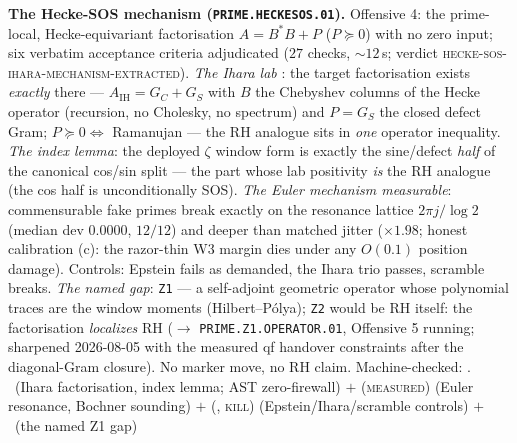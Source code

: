 \par\smallskip\noindent\textbf{The Hecke-SOS mechanism
(\texttt{PRIME.HECKESOS.01}).}
Offensive 4: the prime-local, Hecke-equivariant factorisation
$A=B^*B+P$ ($P\succeq0$) with no zero input; six verbatim acceptance
criteria adjudicated ($27$ checks, ${\sim}12$\,s; verdict
\textsc{hecke-sos-ihara-mechanism-extracted}).  \emph{The Ihara lab}
\mE: the target factorisation exists \emph{exactly} there ---
$A_{\mathrm{IH}}=G_C+G_S$ with $B$ the Chebyshev columns of the
Hecke operator (recursion, no Cholesky, no spectrum) and $P=G_S$ the
closed defect Gram; $P\succeq0\iff$ Ramanujan --- the RH analogue
sits in \emph{one} operator inequality.  \emph{The index lemma}: the
deployed $\zeta$ window form is exactly the sine/defect \emph{half}
of the canonical cos/sin split --- the part whose lab positivity
\emph{is} the RH analogue (the cos half is unconditionally SOS).
\emph{The Euler mechanism measurable}: commensurable fake primes
break exactly on the resonance lattice $2\pi j/\log2$ (median dev
$0.0000$, $12/12$) and deeper than matched jitter ($\times1.98$;
honest calibration (c): the razor-thin W3 margin dies under any
$O(0.1)$ position damage).  Controls: Epstein fails as demanded,
the Ihara trio passes, scramble breaks.  \emph{The named gap}:
\texttt{Z1} --- a self-adjoint geometric operator whose polynomial
traces are the window moments (Hilbert--P\'olya); \texttt{Z2} would
be RH itself: the factorisation \emph{localizes} RH
($\to$ \texttt{PRIME.Z1.OPERATOR.01}, Offensive 5 running;
sharpened 2026-08-05 with the measured qf handover constraints
after the diagonal-Gram closure).  No
marker move, no RH claim.
Machine-checked: .
\mE\ (Ihara factorisation, index lemma; AST zero-firewall) $+$
(\textsc{measured}) (Euler resonance, Bochner sounding) $+$ (\mE,
\textsc{kill}) (Epstein/Ihara/scramble controls) $+$ \mC\ (the named
Z1 gap)
\par\smallskip



